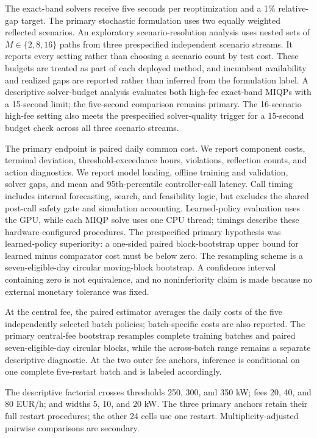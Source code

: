 \documentclass[preprint,11pt]{elsarticle}
\theoremstyle{plain}
\theoremstyle{remark}
\begin{document}
The exact-band solvers receive five seconds per reoptimization and a 1\%
relative-gap target. The primary stochastic formulation uses two
equally weighted reflected scenarios. An exploratory scenario-resolution
analysis uses nested sets of $M\in\{2,8,16\}$ paths from three prespecified
independent scenario streams. It reports every setting rather than choosing a
scenario count by test cost. These budgets are treated as part of each deployed method,
and incumbent availability and realized gaps are reported rather than inferred
from the formulation label. A descriptive solver-budget analysis evaluates
both high-fee exact-band MIQPs with a 15-second limit; the five-second
comparison remains primary. The 16-scenario high-fee setting also meets the
prespecified solver-quality trigger for a 15-second budget check across all
three scenario streams.

The primary endpoint is paired daily common cost. We report component costs,
terminal deviation, threshold-exceedance hours, violations, reflection counts,
and action diagnostics. We report model loading, offline training and
validation, solver gaps, and mean and 95th-percentile controller-call latency.
Call timing includes internal forecasting, search, and feasibility logic, but
excludes the shared post-call safety gate and simulation accounting.
Learned-policy evaluation uses the GPU, while each MIQP solve uses one CPU
thread; timings describe these hardware-configured procedures.
The prespecified primary hypothesis was learned-policy superiority: a
one-sided paired block-bootstrap upper bound for learned minus comparator cost
must be below zero. The resampling scheme is a seven-eligible-day circular
moving-block bootstrap. A confidence interval containing
zero is not equivalence, and no noninferiority claim is made because no external
monetary tolerance was fixed.

At the central fee, the paired estimator averages the daily costs of the five
independently selected batch policies; batch-specific costs are also reported.
The primary central-fee bootstrap resamples complete training batches and
paired seven-eligible-day circular blocks, while the across-batch range remains a
separate descriptive diagnostic. At the two outer fee anchors, inference is
conditional on one complete five-restart batch and is labeled accordingly.

The descriptive factorial crosses thresholds 250, 300, and 350 kW; fees 20,
40, and 80 EUR/h; and widths 5, 10, and 20 kW. The three primary anchors retain
their full restart procedures; the other 24 cells use one restart.
Multiplicity-adjusted pairwise comparisons are secondary.
\end{document}
